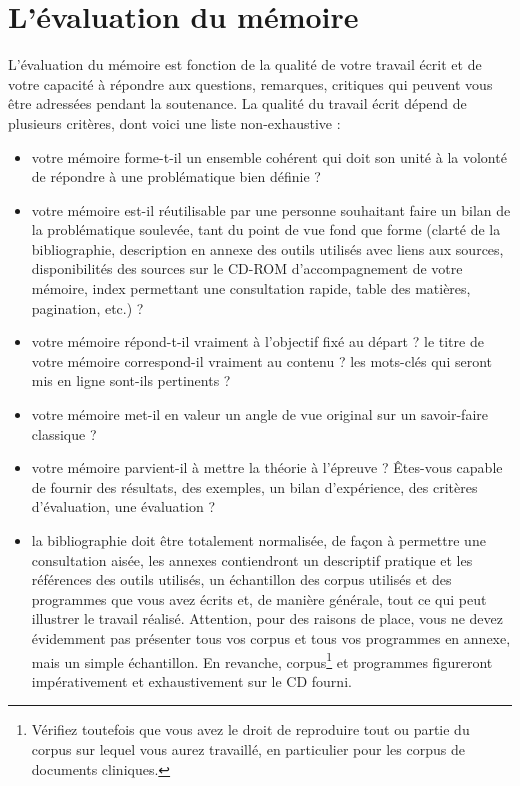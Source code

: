 \documentclass{report}
\begin{document}
\section{L'évaluation du mémoire}
L'évaluation du mémoire est fonction de la qualité de votre travail écrit et de votre capacité à répondre aux questions, remarques, critiques qui peuvent vous être adressées pendant la soutenance. La qualité du travail écrit dépend de plusieurs critères, dont voici une liste non-exhaustive :
\begin{itemize}
\item votre mémoire forme-t-il un ensemble cohérent qui doit son unité à la volonté de répondre à une problématique bien définie ?
\item votre mémoire est-il réutilisable par une personne souhaitant faire un bilan de la problématique soulevée, tant du point de vue fond que forme (clarté de la bibliographie, description en annexe des outils utilisés avec liens aux sources, disponibilités des sources sur le CD-ROM d'accompagnement de votre mémoire, index permettant une consultation rapide, table des matières, pagination, etc.) ?
\item votre mémoire répond-t-il vraiment à l'objectif fixé au départ ? le titre de votre mémoire correspond-il vraiment au contenu ? les mots-clés qui seront mis en ligne sont-ils pertinents ?
\item votre mémoire met-il en valeur un angle de vue original sur un savoir-faire classique ?
\item votre mémoire parvient-il à mettre la théorie à l'épreuve ? \^Etes-vous capable de fournir des résultats, des exemples, un bilan d'expérience, des critères d'évaluation, une évaluation ?
\item la bibliographie doit être totalement normalisée, de façon à permettre une consultation aisée, les annexes contiendront un descriptif pratique et les références des outils utilisés, un échantillon des corpus utilisés et des programmes que vous avez écrits et, de manière générale, tout ce qui peut illustrer le travail réalisé. Attention, pour des raisons de place, vous ne devez évidemment pas présenter tous vos corpus et tous vos programmes en annexe, mais un simple échantillon. En revanche, corpus\footnote{Vérifiez toutefois que vous avez le droit de reproduire tout ou partie du corpus sur lequel vous aurez travaillé, en particulier pour les corpus de documents cliniques.} et programmes figureront impérativement et exhaustivement sur le CD fourni.
\end{itemize}
\end{document}
